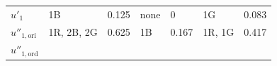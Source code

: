 \begin{longtable}[]{@{}lllllll@{}}
\begin{minipage}[b]{0.08\columnwidth}
\end{minipage}\tabularnewline
\midrule
\endhead
\begin{minipage}[t]{0.12\columnwidth}\raggedright
\(u'_1\)\strut
\end{minipage} & \begin{minipage}[t]{0.14\columnwidth}\raggedright
1B\strut
\end{minipage} & \begin{minipage}[t]{0.08\columnwidth}\raggedright
0.125\strut
\end{minipage} & \begin{minipage}[t]{0.14\columnwidth}\raggedright
none\strut
\end{minipage} & \begin{minipage}[t]{0.08\columnwidth}\raggedright
0\strut
\end{minipage} & \begin{minipage}[t]{0.14\columnwidth}\raggedright
1G\strut
\end{minipage} & \begin{minipage}[t]{0.08\columnwidth}\raggedright
0.083\strut
\end{minipage}\tabularnewline
\begin{minipage}[t]{0.12\columnwidth}\raggedright
\(u''_{1,\text{ori}}\)\strut
\end{minipage} & \begin{minipage}[t]{0.14\columnwidth}\raggedright
1R, 2B, 2G\strut
\end{minipage} & \begin{minipage}[t]{0.08\columnwidth}\raggedright
0.625\strut
\end{minipage} & \begin{minipage}[t]{0.14\columnwidth}\raggedright
1B\strut
\end{minipage} & \begin{minipage}[t]{0.08\columnwidth}\raggedright
0.167\strut
\end{minipage} & \begin{minipage}[t]{0.14\columnwidth}\raggedright
1R, 1G\strut
\end{minipage} & \begin{minipage}[t]{0.08\columnwidth}\raggedright
0.417\strut
\end{minipage}\tabularnewline
\begin{minipage}[t]{0.12\columnwidth}\raggedright
\(u''_{1,\text{ord}}\)\strut
\end{minipage} & \begin{minipage}[t]{0.14\columnwidth}\raggedright

\end{minipage}
\end{longtable}
